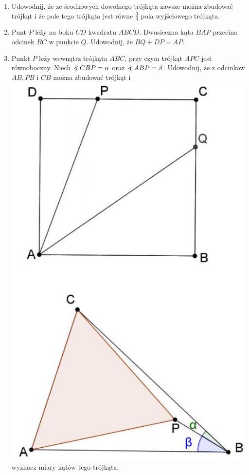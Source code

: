 \documentclass[10pt]{article}
\newcommand\Varangle{\mathop{{<\!\!\!\!\!\text{\small)}}\:}\nolimits}
\begin{document}
\begin{enumerate}
  \item Udowodnij, że ze środkowych dowolnego trójkąta zawsze można zbudować trójkąt i że pole tego trójkąta jest równe \(\frac{3}{4}\) pola wyjściowego trójkąta.
  \item Punt \(P\) leży na boku \(C D\) kwadratu \(A B C D\). Dwusieczna kąta \(B A P\) przecina odcinek \(B C\) w punkcie \(Q\). Udowodnij, że \(B Q+D P=A P\).
  \item Punkt \(P\) leży wewnątrz trójkąta \(A B C\), przy czym trójkąt \(A P C\) jest równoboczny. Niech \(\Varangle C B P=\alpha\) oraz \(\Varangle A B P=\beta\). Udowodnij, że z odcinków \(A B, P B\) i \(C B\) można zbudować trójkąt i\\
\includegraphics[max width=\textwidth, center]{2024_11_21_1c9a743c22bda6d33a9bg-1(1)}\\
wyznacz miary kątów tego trójkąta.
\end{enumerate}
\end{document}
